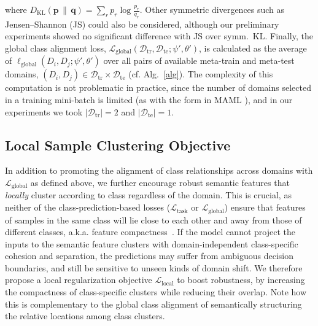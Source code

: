 \documentclass{article}
\newcommand{\Domains}{\mathcal{D}}
\newcommand{\TrainDomains}{\Domains_\mathrm{tr}}
\newcommand{\TestDomains}{\Domains_\mathrm{te}}
\newcommand{\TaskLoss}{\mathcal{L}_\mathrm{task}}
\newcommand{\LabelLoss}{\mathcal{L}_\mathrm{global}}
\newcommand{\LabelLossPair}{\ell_\mathrm{global}}
\newcommand{\MetricLoss}{\mathcal{L}_\mathrm{local}}
\newcommand{\KLDiv}{D_\mathrm{KL}}
\def\*#1{\mathbf{#1}}
\begin{document}
where $\KLDiv(\*p\,\|\,\*q) = \sum_r p_r \log\frac{p_r}{q_r}$. Other symmetric divergences such as Jensen--Shannon (JS) could also be considered, although our preliminary experiments showed no significant difference with JS over symm.\ KL. Finally, the global class alignment loss, $\LabelLoss(\TrainDomains,\TestDomains; \psi',\theta')$, is calculated as the average of $\LabelLossPair(D_i,D_j; \psi',\theta')$ over all pairs of available meta-train and meta-test domains, $(D_i,D_j) \in \TrainDomains\times\TestDomains$ (cf. Alg.~\ref{alg}).
The complexity of this computation is not problematic in practice, since the number of domains selected in a training mini-batch is limited (as with the form in MAML \citep{finn2017model}), and in our experiments we took $|\TrainDomains|=2$ and $|\TestDomains|=1$.



\subsection{Local Sample Clustering Objective}\label{sec:local_loss}

\newcommand{\Margin}{\xi}

In addition to promoting the alignment of class relationships across domains with $\LabelLoss$ as defined above, we further encourage robust semantic features that \emph{locally} cluster according to class regardless of the domain. This is crucial, as neither of the class-prediction-based losses ($\TaskLoss$ or $\LabelLoss$) ensure that features of samples in the same class will lie close to each other and away from those of different classes, a.k.a. feature compactness~\cite{kamnitsas2018semi}.
If the model cannot project the inputs to the semantic feature clusters with domain-independent class-specific cohesion and separation, the predictions may suffer from ambiguous decision boundaries, and still be sensitive to unseen kinds of domain shift. We therefore propose a local regularization objective $\MetricLoss$ to boost robustness, by increasing the compactness of class-specific clusters while reducing their overlap. Note how this is complementary to the global class alignment of semantically structuring the relative locations among class clusters.
\end{document}
